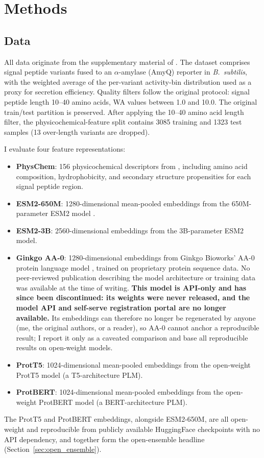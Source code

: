 \documentclass[12pt]{article}
\begin{document}
\section{Methods}
\label{sec:methods}

\subsection{Data}
\label{sec:data}

All data originate from the supplementary material of \citet{grasso2023}.
The dataset comprises signal peptide variants fused to an $\alpha$-amylase (AmyQ) reporter in \textit{B.\ subtilis}, with the weighted average of the per-variant activity-bin distribution used as a proxy for secretion efficiency.
Quality filters follow the original protocol: signal peptide length 10--40 amino acids, WA values between 1.0 and 10.0.
The original train/test partition is preserved. After applying the 10--40 amino acid length filter, the physicochemical-feature split contains 3085 training and 1323 test samples (13 over-length variants are dropped).

I evaluate four feature representations:
\begin{itemize}
    \item \textbf{PhysChem}: 156 physicochemical descriptors from \citet{grasso2023}, including amino acid composition, hydrophobicity, and secondary structure propensities for each signal peptide region.
    \item \textbf{ESM2-650M}: 1280-dimensional mean-pooled embeddings from the 650M-parameter ESM2 model \citep{lin2023}.
    \item \textbf{ESM2-3B}: 2560-dimensional embeddings from the 3B-parameter ESM2 model.
    \item \textbf{Ginkgo AA-0}: 1280-dimensional embeddings from Ginkgo Bioworks' AA-0 protein language model \citep{ginkgo2024}, trained on proprietary protein sequence data.
    No peer-reviewed publication describing the model architecture or training data was available at the time of writing.
    \textbf{This model is API-only and has since been discontinued: its weights were never released, and the model API and self-serve registration portal are no longer available.} Its embeddings can therefore no longer be regenerated by anyone (me, the original authors, or a reader), so AA-0 cannot anchor a reproducible result; I report it only as a caveated comparison and base all reproducible results on open-weight models.
    \item \textbf{ProtT5}: 1024-dimensional mean-pooled embeddings from the open-weight ProtT5 model \citep{elnaggar2022} (a T5-architecture PLM).
    \item \textbf{ProtBERT}: 1024-dimensional mean-pooled embeddings from the open-weight ProtBERT model \citep{elnaggar2022} (a BERT-architecture PLM).
\end{itemize}
The ProtT5 and ProtBERT embeddings, alongside ESM2-650M, are all open-weight and reproducible from publicly available HuggingFace checkpoints with no API dependency, and together form the open-ensemble headline (Section~\ref{sec:open_ensemble}).
\end{document}
